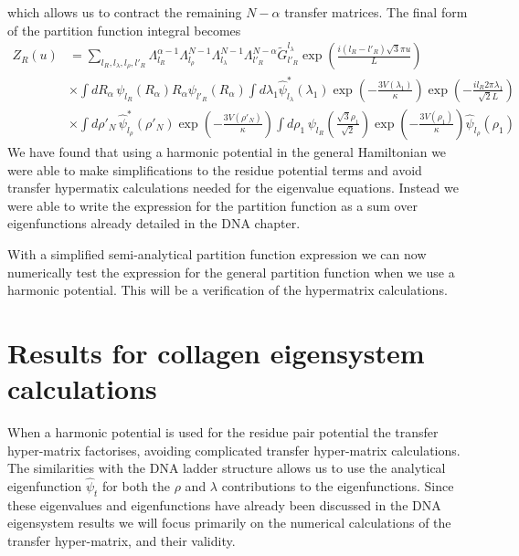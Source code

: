 %
which allows us to contract the remaining $N-\alpha$ transfer matrices. The final form of the partition function integral becomes
%
\begin{equation}\label{col_har_mxd_r_4}
\begin{split}
Z_{R}\left(u\right) &=\sum_{l_R,l_\lambda,l_\rho,l'_R}\Lambda_{l_R}^{\alpha-1}\Lambda_{l_\rho}^{N-1}\Lambda_{l_\lambda}^{N-1}\Lambda_{l'_R}^{N-\alpha}\tilde{G}_{l'_R}^{l_{\lambda}}\exp\left(\frac{i(l_{R}-l'_{R})\sqrt{3}\pi u}{L}\right)\\
&\times\int dR_{\alpha}\,\psi_{l_R}\left(R_{\alpha}\right)R_{\alpha}\psi_{l'_R}\left(R_{\alpha}\right)\int d\lambda_1\hat{\psi}^{*}_{l_\lambda}\left(\lambda_{1}\right)\exp\left(-\frac{3V(\lambda_{1})}{\kappa}\right)\exp\left(-\frac{il_{R}2\pi\lambda_1}{\sqrt{2}L} \right)\\
&\times\int d\rho'_N\,\hat{\psi}^{*}_{l_\rho}\left(\rho'_{N}\right)\exp\left(-\frac{3V(\rho'_{N})}{\kappa}\right)\int d\rho_1\,\psi_{l_R}\left( \frac{\sqrt{3}\rho_1}{\sqrt{2}}\right)\exp\left(-\frac{3V(\rho_{1})}{\kappa}\right)\hat{\psi}_{l_\rho}\left(\rho_{1}\right)
\end{split}
\end{equation} 
%
We have found that using a harmonic potential in the general Hamiltonian we were able to make simplifications to the residue potential terms and avoid transfer hypermatix calculations needed for the eigenvalue equations. Instead we were able to write the expression for the partition function as a sum over eigenfunctions already detailed in the DNA chapter.

With a simplified semi-analytical partition function expression we can now numerically test the expression for the general partition function when we use a harmonic potential. This will be a verification of the hypermatrix calculations.

\newpage
\section{Results for collagen eigensystem calculations}

When a harmonic potential is used for the residue pair potential the transfer hyper-matrix factorises, avoiding  complicated transfer hyper-matrix calculations. The similarities with the DNA ladder structure allows us to use the analytical eigenfunction $\hat{\psi}_t$ for both the $\rho$ and $\lambda$ contributions to the eigenfunctions. Since these eigenvalues and eigenfunctions have already been discussed in the DNA eigensystem results we will focus primarily on the numerical calculations of the transfer hyper-matrix, and their validity.  

